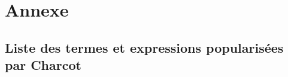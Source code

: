 \part*{Annexe}
\appendix
\label{appendix:termes_expressions}

\chapter*{Liste des termes et expressions popularisées par Charcot}



\makeatletter
\renewcommand{\thesection}{\@arabic\c@section}
\makeatother

\setcounter{section}{0}


%

